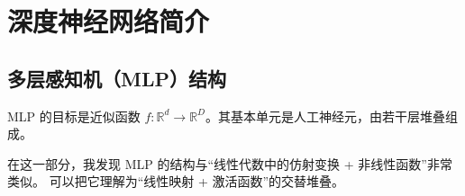 \chapter{深度神经网络简介}

\section{多层感知机（MLP）结构}
MLP 的目标是近似函数 $f: \mathbb{R}^d \to \mathbb{R}^D$。其基本单元是人工神经元，由若干层堆叠组成。

\begin{mycomment}
在这一部分，我发现 MLP 的结构与“线性代数中的仿射变换 + 非线性函数”非常类似。  
可以把它理解为“线性映射 + 激活函数”的交替堆叠。  
\end{mycomment}

\newpage

